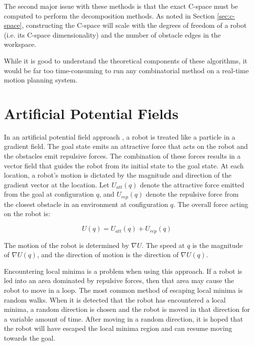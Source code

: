 \documentclass[10pt,conference]{ieeeconf}
\begin{document}
The second major issue with these methods is that the exact C-space must be computed to perform the decomposition methods. As noted in Section \ref{sec:c-space}, constructing the C-space will scale with the degrees of freedom of a robot (i.e. its C-space dimensionality) and the number of obstacle edges in the workspace.

While it is good to understand the theoretical components of these algorithms, it would be far too time-consuming to run any combinatorial method on a real-time motion planning system. 




\section{Artificial Potential Fields} \label{sec:potfields}

In an artificial potential field approach \cite{khatib1986real}, a robot is treated like a particle in a gradient field. The goal state emits an attractive force that acts on the robot and the obstacles emit repulsive forces. The combination of these forces results in a vector field that guides the robot from its initial state to the goal state. At each location, a robot's motion is dictated by the magnitude and direction of the gradient vector at the location. Let $U_{att}(q)$ denote the attractive force emitted from the goal at configuration $q$, and $U_{rep}(q)$ denote the repulsive force from the closest obstacle in an environment at configuration $q$. The overall force acting on the robot is:

\begin{equation}
U(q) = U_{att}(q) + U_{rep}(q)
\end{equation}

The motion of the robot is determined by $\nabla U$. The speed at $q$ is the magnitude of $\nabla U(q)$, and the direction of motion is the direction of $\nabla U(q)$. 

Encountering local minima is a problem when using this approach. If a robot is led into an area dominated by repulsive forces, then that area may cause the robot to move in a loop. The most common method of escaping local minima is random walks. When it is detected that the robot has encountered a local minima, a random direction is chosen and the robot is moved in that direction for a variable amount of time. After moving in a random direction, it is hoped that the robot will have escaped the local minima region and can resume moving towards the goal.
\end{document}
